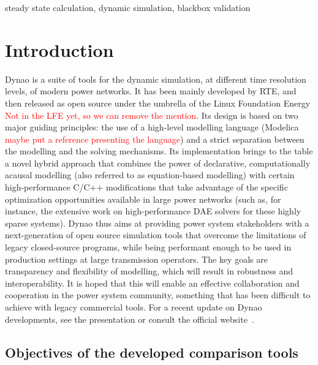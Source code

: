 \documentclass[conference]{IEEEtran}
\newcommand{\Dynawo}{Dyna\textomega o} %
\begin{document}
\begin{IEEEkeywords}
  steady state calculation, dynamic simulation, blackbox validation
\end{IEEEkeywords}




\section{Introduction}

\Dynawo{}\cite{Guironnet18} is a suite of tools for the dynamic simulation, at
different time resolution levels, of modern power networks. It has been mainly
developed by RTE, and then released as open source under the umbrella of the
Linux Foundation Energy \textcolor{red}{Not in the LFE yet, so we can remove the mention}.  Its design is based on two major guiding principles:
the use of a high-level modelling language (Modelica \textcolor{red}{maybe put a reference presenting the language}) and a strict separation
between the modelling and the solving mechanisms.  Its implementation brings to
the table a novel hybrid approach that combines the power of declarative,
computationally acausal modelling (also referred to as equation-based modelling)
with certain high-performance C/C++ modifications that take advantage of the
specific optimization opportunities available in large power networks (such as,
for instance, the extensive work on high-performance DAE solvers for these
highly sparse systems).  \Dynawo{} thus aims at providing power system
stakeholders with a next-generation of open source simulation tools that overcome the
limitations of legacy closed-source programs, while being performant enough to
be used in production settings at large transmission operators. The key goals
are transparency and flexibility of modelling, which will result in robustness
and interoperability. It is hoped that this will enable an effective
collaboration and cooperation in the power system community, something that has
been difficult to achieve with legacy commercial tools.  For a recent update on
\Dynawo{} developments, see the presentation \cite{Guironnet21} or consult the
official website~\cite{Dynawo}.



\subsection{Objectives of the developed comparison tools}
\end{document}
